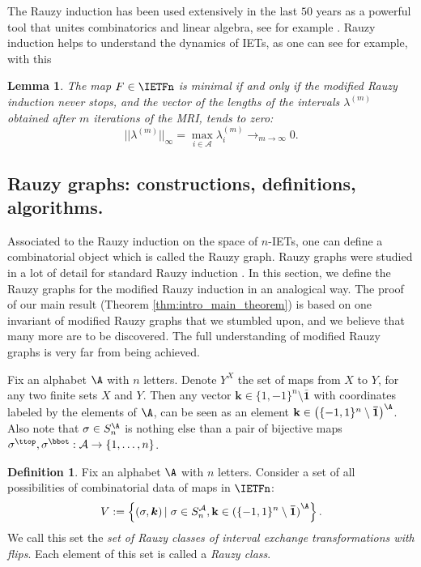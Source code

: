 \documentclass[12pt]{article}
\newcommand{\one}{\boldsymbol{\bar{1}}}
\newtheorem{lemma}{Lemma}
\theoremstyle{definition}
\newtheorem{definition}{Definition}
\begin{document}
The Rauzy induction has been used extensively in the last $50$ years as a powerful tool that unites combinatorics and linear algebra, see for example \cite{AR91, AHS16, BL, KZ03, ST18}. Rauzy induction helps to understand the dynamics of IETs, as one can see for example, with this

\begin{lemma}\cite{R79, K75, N89}\label{lemma:minimality}
The map $F \in \IETFn$ is minimal if and only if the modified Rauzy induction never stops, and the vector of the lengths of the intervals $\lambda^{(m)}$ obtained after $m$ iterations of the MRI, tends to zero:
$$
||\lambda^{(m)}||_{\infty}= \max_{i \in \mathcal{A}} \lambda^{(m)}_i \rightarrow_{m \rightarrow \infty} 0.
$$
\end{lemma}

\subsection{Rauzy graphs: constructions, definitions, algorithms.}
Associated to the Rauzy induction on the space of $n$-IETs, one can define a combinatorial object which is called the Rauzy graph. Rauzy graphs were studied in a lot of detail for standard Rauzy induction \cite{KZ03, DM17}. In this section, we define the Rauzy graphs for the modified Rauzy induction in an analogical way.  The proof of our main result (Theorem \ref{thm:intro_main_theorem}) is based on one invariant of modified Rauzy graphs that we stumbled upon, and we believe that many more are to be discovered. The full understanding of modified Rauzy graphs is very far from being achieved.

Fix an alphabet $\A$ with $n$ letters. Denote $Y^X$ the set of maps from $X$ to $Y$, for any two finite sets $X$ and $Y$. Then any vector $\boldsymbol{k} \in \{1,-1\}^n \setminus\boldsymbol{\bar{1}}$ with coordinates labeled by the elements of $\A$, can be seen as an element $\textbf{k} \in {\left(\{-1,1\}^n \setminus \one\right)}^{\A}$.
Also note that $\sigma \in S_n^{\A}$ is nothing else than a pair of bijective maps $\sigma^{\ttop}, \sigma^{\bbot}: \mathcal{A} \rightarrow \{1, \ldots, n\}$.
\begin{definition}
Fix an alphabet $\A$ with $n$ letters. Consider a set of all possibilities of combinatorial data of maps in $\IETFn$:
\begin{equation*}
V:= \left\{(\sigma, \boldsymbol{k}) \left| \right.
\sigma \in S_n^{\mathcal{A}}, \textbf{k} \in {(\{-1,1\}^n \setminus \one)}^{\A}
\right\}.
\end{equation*}
We call this set the \emph{set of Rauzy classes of interval exchange transformations with flips}. Each element of this set is called a \emph{Rauzy class}.
\end{definition}
\end{document}
